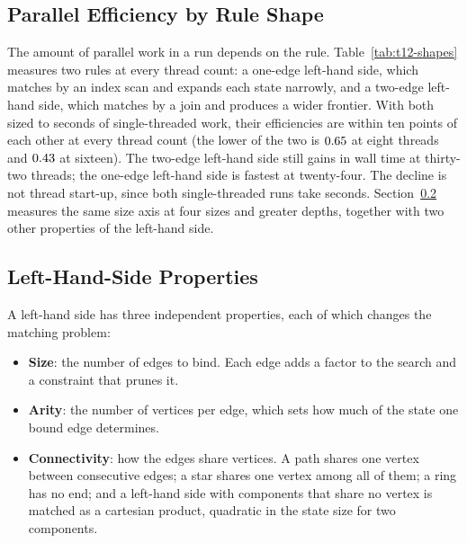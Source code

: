 \subsection{Parallel Efficiency by Rule Shape}
The amount of parallel work in a run depends on the rule. Table~\ref{tab:t12-shapes} measures two
rules at every thread count: a one-edge left-hand side, which matches by an index scan and expands
each state narrowly, and a two-edge left-hand side, which matches by a join and produces a wider
frontier. With both sized to seconds of single-threaded work, their efficiencies are within ten
points of each other at every thread count (the lower of the two is $0.65$ at eight threads
and $0.43$ at sixteen). The two-edge left-hand side still gains in wall time at
thirty-two threads; the one-edge left-hand side is fastest at twenty-four. The decline is not
thread start-up, since both single-threaded runs take seconds.
Section~\ref{sec:lhs-space} measures the same size axis at four sizes and greater depths, together
with two other properties of the left-hand side.

\begin{table}[htbp]
\centering
\caption{Wall time and parallel efficiency by thread count for a one-edge and a
two-edge left-hand side.}
\label{tab:t12-shapes}

\end{table}

\subsection{Left-Hand-Side Properties}
\label{sec:lhs-space}

A left-hand side has three independent properties, each of which changes the matching problem:

\begin{itemize}
\item \textbf{Size}: the number of edges to bind. Each edge adds a factor to the search and a
      constraint that prunes it.
\item \textbf{Arity}: the number of vertices per edge, which sets how much of the state one bound
      edge determines.
\item \textbf{Connectivity}: how the edges share vertices. A path shares one vertex between
      consecutive edges; a star shares one vertex among all of them; a ring has no end; and a
      left-hand side with components that share no vertex is matched as a cartesian product,
      quadratic in the state size for two components.
\end{itemize}

